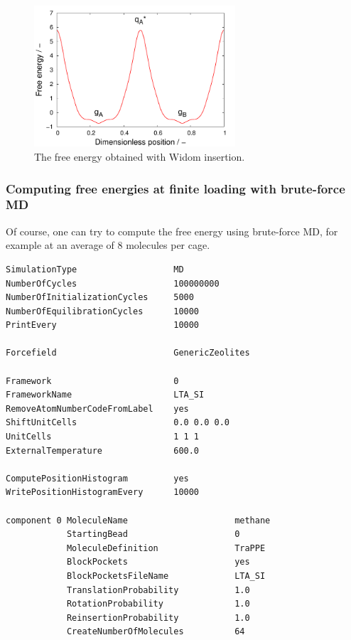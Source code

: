 \begin{figure}[t]
  \centering
  \includegraphics[width=7.5cm]{./Examples/Figures/Umbrella/BiasingProfile/BiasingSpline.pdf}
  \caption{The free energy obtained with Widom insertion.}
  \label{Fig: LTA Widom}
\end{figure}

\subsubsection{Computing free energies at finite loading with brute-force MD}

Of course, one can try to compute the free energy using brute-force MD, for example at an average of 8 molecules per cage.
\begin{tiny}
\begin{verbatim}
SimulationType                   MD
NumberOfCycles                   100000000
NumberOfInitializationCycles     5000
NumberOfEquilibrationCycles      10000
PrintEvery                       10000

Forcefield                       GenericZeolites

Framework                        0
FrameworkName                    LTA_SI
RemoveAtomNumberCodeFromLabel    yes
ShiftUnitCells                   0.0 0.0 0.0
UnitCells                        1 1 1
ExternalTemperature              600.0

ComputePositionHistogram         yes
WritePositionHistogramEvery      10000

component 0 MoleculeName                     methane
            StartingBead                     0
            MoleculeDefinition               TraPPE
            BlockPockets                     yes
            BlockPocketsFileName             LTA_SI
            TranslationProbability           1.0
            RotationProbability              1.0
            ReinsertionProbability           1.0
            CreateNumberOfMolecules          64
\end{verbatim}
\end{tiny}

